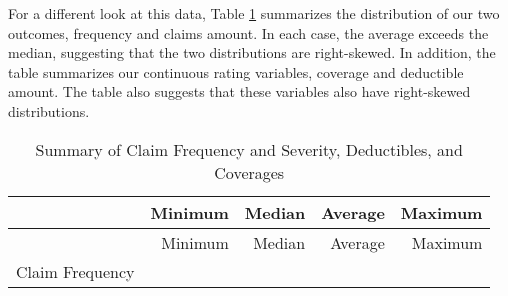 \documentclass[]{book}
\theoremstyle{definition}
\theoremstyle{definition}
\theoremstyle{definition}
\theoremstyle{remark}
\begin{document}
For a different look at this data, Table \ref{tab:DeductCov} summarizes
the distribution of our two outcomes, frequency and claims amount. In
each case, the average exceeds the median, suggesting that the two
distributions are right-skewed. In addition, the table summarizes our
continuous rating variables, coverage and deductible amount. The table
also suggests that these variables also have right-skewed distributions.

\begin{longtable}[]{@{}lrrrr@{}}
\caption{\label{tab:DeductCov} Summary of Claim Frequency and Severity,
Deductibles, and Coverages}\tabularnewline
\toprule
\begin{minipage}[b]{0.23\columnwidth}\raggedright\strut
\strut
\end{minipage} & \begin{minipage}[b]{0.12\columnwidth}\raggedleft\strut
Minimum\strut
\end{minipage} & \begin{minipage}[b]{0.11\columnwidth}\raggedleft\strut
Median\strut
\end{minipage} & \begin{minipage}[b]{0.12\columnwidth}\raggedleft\strut
Average\strut
\end{minipage} & \begin{minipage}[b]{0.14\columnwidth}\raggedleft\strut
Maximum\strut
\end{minipage}\tabularnewline
\midrule
\endfirsthead
\toprule
\begin{minipage}[b]{0.23\columnwidth}\raggedright\strut
\strut
\end{minipage} & \begin{minipage}[b]{0.12\columnwidth}\raggedleft\strut
Minimum\strut
\end{minipage} & \begin{minipage}[b]{0.11\columnwidth}\raggedleft\strut
Median\strut
\end{minipage} & \begin{minipage}[b]{0.12\columnwidth}\raggedleft\strut
Average\strut
\end{minipage} & \begin{minipage}[b]{0.14\columnwidth}\raggedleft\strut
Maximum\strut
\end{minipage}\tabularnewline
\midrule
\endhead
\begin{minipage}[t]{0.23\columnwidth}\raggedright\strut
Claim Frequency\strut
\end{minipage} & \begin{minipage}[t]{0.12\columnwidth}\raggedleft\strut

\end{minipage}
\end{longtable}
\end{document}
